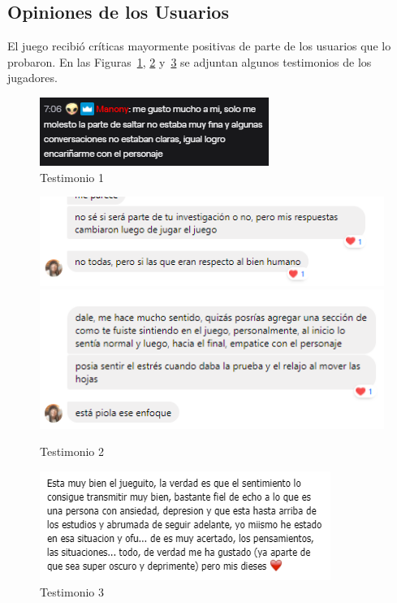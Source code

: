 
\subsection{Opiniones de los Usuarios}
El juego recibió críticas mayormente positivas de parte de los usuarios que lo probaron. En las Figuras~\ref{fig:testimonio1}, \ref{fig:testimonio2} y~\ref{fig:testimonio3} se adjuntan algunos testimonios de los jugadores.

\begin{figure}[ht]
    \centering
    \includegraphics{imgs/feedback.png}
    \caption{Testimonio 1}
    \label{fig:testimonio1}
\end{figure}

\begin{figure}[ht]
    \centering
    \includegraphics{imgs/feedback2.png}
    \includegraphics{imgs/feedback3.png}
    \caption{Testimonio 2}
    \label{fig:testimonio2}
\end{figure}

\begin{figure}[ht]
    \centering
    \includegraphics{imgs/feedback7.png}
    \caption{Testimonio 3}
    \label{fig:testimonio3}
\end{figure}

